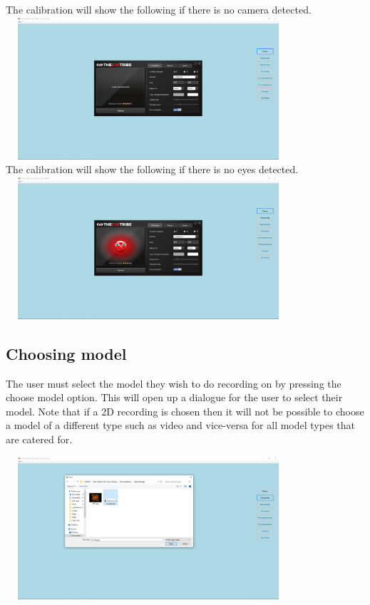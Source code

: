 The calibration will show the following if there is no camera detected.\\
\includegraphics[width=400px,height=200px]{./Images/NoCameraCalibration.PNG}\\

The calibration will show the following if there is no eyes detected.\\
\includegraphics[width=400px,height=200px]{./Images/NoEyeCalibration.PNG}\\

\subsection{Choosing model}
The user must select the model they wish to do recording on by pressing the choose model option. This will open up a dialogue for the user to select their model. Note that if a 2D recording is chosen then it will not be possible to choose a model of a different type such as video and vice-versa for all model types that are catered for.

\includegraphics[width=400px,height=200px]{./Images/ChooseModel.PNG}

